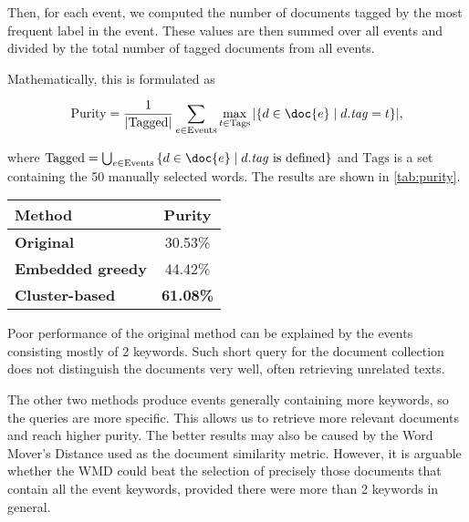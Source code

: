 Then, for each event, we computed the number of documents tagged by the most frequent label in the event. These values are then summed over all events and divided by the total number of tagged documents from all events.

Mathematically, this is formulated as

\begin{equation}
	\text{Purity} = \frac{1}{\left| \text{Tagged} \right|} \sum_{e \in \text{Events}}{\max_{t \in \text{Tags}} {\left| \{ d \in \doc{e} \mid d.\mathit{tag} = t \} \right|} },
\end{equation}

where $\text{Tagged} = \bigcup_{e \in \text{Events}}{\{ d \in \doc{e} \mid d.\mathit{tag} \text{ is defined} \}}$ and $\text{Tags}$ is a set containing the 50 manually selected words. The results are shown in \autoref{tab:purity}.

\hspace{\fill}

\begin{minipage}{\linewidth}
\centering
\begin{tabular}{ l c }\toprule[1.5pt]
\bf Method 	 & \bf Purity \\ \midrule
\bf Original &  30.53\% \\
\bf Embedded greedy   &  44.42\% \\
\bf Cluster-based &  \bf 61.08\% \\ \bottomrule[1.25pt]
\end {tabular}\par
{} \label{tab:purity} 
\end{minipage}

\hspace{\fill}

Poor performance of the original method can be explained by the events consisting mostly of 2 keywords. Such short query for the document collection does not distinguish the documents very well, often retrieving unrelated texts.

The other two methods produce events generally containing more keywords, so the queries are more specific. This allows us to retrieve more relevant documents and reach higher purity. The better results may also be caused by the Word Mover's Distance used as the document similarity metric. However, it is arguable whether the WMD could beat the selection of precisely those documents that contain all the event keywords, provided there were more than 2 keywords in general.

